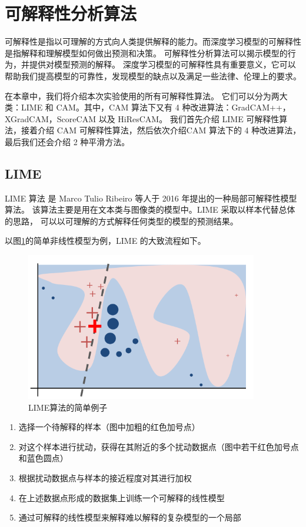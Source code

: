 \documentclass[supercite]{Experimental_Report}
\theoremstyle{definition}
\begin{document}
\section{可解释性分析算法}
可解释性是指以可理解的方式向人类提供解释的能力。而深度学习模型的可解释性是指解释和理解模型如何做出预测和决策。
可解释性分析算法可以揭示模型的行为，并提供对模型预测的解释。
深度学习模型的可解释性具有重要意义，它可以帮助我们提高模型的可靠性，发现模型的缺点以及满足一些法律、伦理上的要求。

在本章中，我们将介绍本次实验使用的所有可解释性算法。
它们可以分为两大类：LIME 和 CAM。其中，CAM 算法下又有 4 种改进算法：GradCAM++，XGradCAM，ScoreCAM 以及 HiResCAM。
我们首先介绍 LIME 可解释性算法，接着介绍 CAM 可解释性算法，然后依次介绍CAM 算法下的 4 种改进算法，最后我们还会介绍 2 种平滑方法。  
\subsection{LIME}

LIME 算法\cite{LIME} 是 Marco Tulio Ribeiro 等人于 2016 年提出的一种局部可解释性模型算法。
该算法主要是用在文本类与图像类的模型中。LIME 采取以样本代替总体的思路，
可以以可理解的方式解释任何类型的模型的预测结果。

以图\ref{LIME算法大致流程}的简单非线性模型为例，LIME 的大致流程如下。
\begin{figure}[H]
	\begin{center}
		\includegraphics[scale=1.0]{../images/LIME算法大致流程.png}
		\caption{LIME算法的简单例子}
		\label{LIME算法大致流程}
	\end{center}
\end{figure}

\begin{enumerate}
	\item 选择一个待解释的样本（图中加粗的红色加号点）
	\item 对这个样本进行扰动，获得在其附近的多个扰动数据点（图中若干红色加号点和蓝色圆点）
	\item 根据扰动数据点与样本的接近程度对其进行加权
	\item 在上述数据点形成的数据集上训练一个可解释的线性模型
	\item 通过可解释的线性模型来解释难以解释的复杂模型的一个局部
\end{enumerate}
\end{document}
